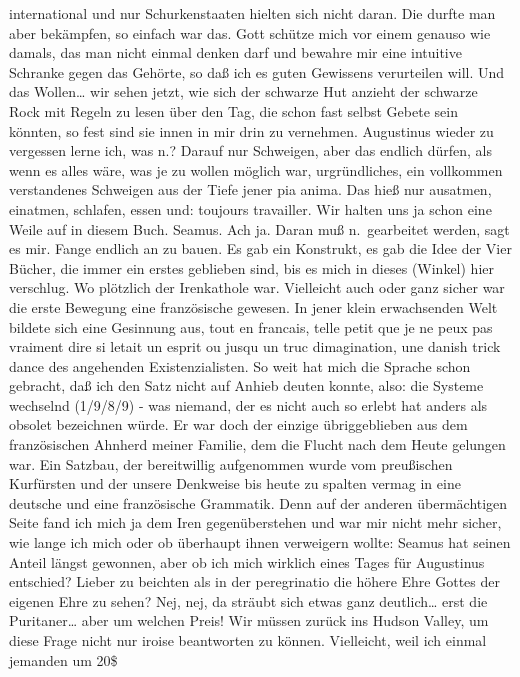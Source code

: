 \documentclass[
]{article}
\begin{document}
international und nur Schurkenstaaten hielten sich nicht daran. Die
durfte man aber bekämpfen, so einfach war das. Gott schütze mich vor
einem genauso wie damals, das man nicht einmal denken darf und bewahre
mir eine intuitive Schranke gegen das Gehörte, so daß ich es guten
Gewissens verurteilen will. Und das Wollen\ldots{} wir sehen jetzt, wie
sich der schwarze Hut anzieht der schwarze Rock mit Regeln zu lesen über
den Tag, die schon fast selbst Gebete sein könnten, so fest sind sie
innen in mir drin zu vernehmen. Augustinus wieder zu vergessen lerne
ich, was n.? Darauf nur Schweigen, aber das endlich dürfen, als wenn es
alles wäre, was je zu wollen möglich war, urgründliches, ein vollkommen
verstandenes Schweigen aus der Tiefe jener pia anima. Das hieß nur
ausatmen, einatmen, schlafen, essen und: toujours travailler. Wir halten
uns ja schon eine Weile auf in diesem Buch. Seamus. Ach ja. Daran muß
n.~gearbeitet werden, sagt es mir. Fange endlich an zu bauen. Es gab ein
Konstrukt, es gab die Idee der Vier Bücher, die immer ein erstes
geblieben sind, bis es mich in dieses (Winkel) hier verschlug. Wo
plötzlich der Irenkathole war. Vielleicht auch oder ganz sicher war die
erste Bewegung eine französische gewesen. In jener klein erwachsenden
Welt bildete sich eine Gesinnung aus, tout en francais, telle petit que
je ne peux pas vraiment dire si l\textquotesingle etait un esprit ou
jusqu\textquotesingle{} un truc d\textquotesingle imagination, une
danish trick dance des angehenden Existenzialisten. So weit hat mich die
Sprache schon gebracht, daß ich den Satz nicht auf Anhieb deuten konnte,
also: die Systeme wechselnd (1/9/8/9) - was niemand, der es nicht auch
so erlebt hat anders als obsolet bezeichnen würde. Er war doch der
einzige übriggeblieben aus dem französischen Ahnherd meiner Familie, dem
die Flucht nach dem Heute gelungen war. Ein Satzbau, der bereitwillig
aufgenommen wurde vom preußischen Kurfürsten und der unsere Denkweise
bis heute zu spalten vermag in eine deutsche und eine französische
Grammatik. Denn auf der anderen übermächtigen Seite fand ich mich ja dem
Iren gegenüberstehen und war mir nicht mehr sicher, wie lange ich mich
oder ob überhaupt ihnen verweigern wollte: Seamus hat seinen Anteil
längst gewonnen, aber ob ich mich wirklich eines Tages für Augustinus
entschied? Lieber zu beichten als in der peregrinatio die höhere Ehre
Gottes der eigenen Ehre zu sehen? Nej, nej, da sträubt sich etwas ganz
deutlich\ldots{} erst die Puritaner\ldots{} aber um welchen Preis! Wir
müssen zurück ins Hudson Valley, um diese Frage nicht nur iroise
beantworten zu können. Vielleicht, weil ich einmal jemanden um 20\$
\end{document}
